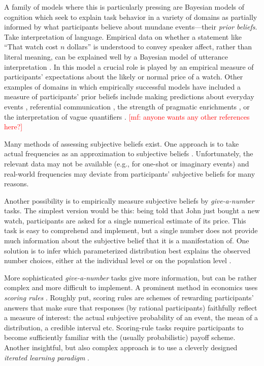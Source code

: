 \documentclass[10pt,letterpaper]{article}
\newcommand{\mf}[1]{\textcolor{Red}{[mf: #1]}}
\newcommand{\citep}[1]{\cite{#1}}
\begin{document}
A family of models where this is particularly pressing are Bayesian models of cognition which
seek to explain task behavior in a variety of domains as partially informed by what
participants believe about mundane events---their \emph{prior beliefs}. Take interpretation of
language. Empirical data on whether a statement like ``That watch cost $n$ dollars'' is
understood to convey speaker affect, rather than literal meaning, can be explained well by a
Bayesian model of utterance interpretation \citep{KaoWu2014:Nonliteral-Unde}. In this model a
crucial role is played by an empirical measure of participants' expectations about the likely
or normal price of a watch.  Other examples of domains in which empirically successful models
have included a measure of participants' prior beliefs include making predictions about
everyday events \citep{GriffithsTenenbaum2006:Optimal-Predict}, referential communication
\citep{FrankGoodman2012:Predicting-Prag}, the strength of pragmatic enrichments
\citep{DegenTessler2015:Wonky-worlds:-L}, or the interpretation of vague quantifiers
\citep{SchollerFranke2015:Semantic-values}. \mf{anyone wants any other references here?}

Many methods of assessing subjective beliefs exist. One approach is to take actual frequencies
as an approximation to subjective beliefs
\citep{GriffithsTenenbaum2006:Optimal-Predict}. Unfortunately, the relevant data may not be
available (e.g., for one-shot or imaginary events) and real-world frequencies may deviate from
participants' subjective beliefs for many reasons.

Another possibility is to empirically measure subjective beliefs by \emph{give-a-number}
tasks. The simplest version would be this: being told that John just bought a new watch,
participants are asked for a single numerical estimate of its price. This task is easy to
comprehend and implement, but a single number does not provide much information about the
subjective belief that it is a manifestation of. One solution is to infer which
parameterized distribution best explains the observed number choices, either at the individual
level \citep{Manski2004:Measuring-Expec} or on the population level
\citep{TauberSteyvers2013:Inferring-Subje}.

More sophisticated \emph{give-a-number} tasks give more information, but can be rather complex
and more difficult to implement. A prominent method in economics uses \emph{scoring rules}
\citep{Savage1971:Elicitation-of-,AndersenFountain2014:Estimating-Subj,SchlagTremewan2014:A-penny-for-you}. Roughly
put, scoring rules are schemes of rewarding participants' answers that make sure that responses
(by rational participants) faithfully reflect a measure of interest: the actual subjective
probability of an event, the mean of a distribution, a credible interval etc. Scoring-rule
tasks require participants to become sufficiently familiar with the (usually probabilistic)
payoff scheme. Another insightful, but also complex approach is to use a cleverly designed
\emph{iterated learning paradigm} \citep{LewandowskyGriffiths2009:The-Wisdom-of-I}.
\end{document}

